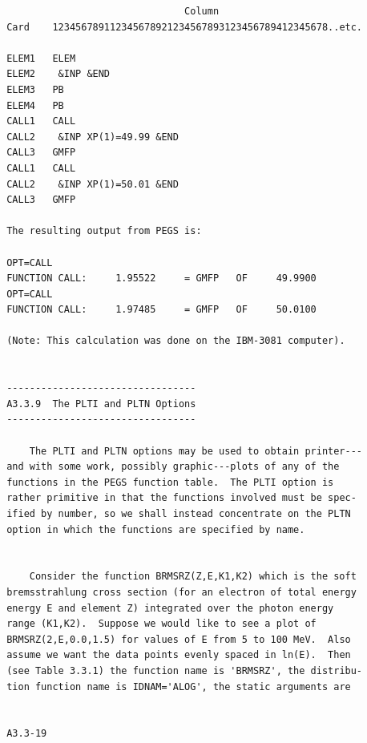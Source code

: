  \begin{verbatim}
                                Column
 Card    123456789112345678921234567893123456789412345678..etc.
 
 ELEM1   ELEM
 ELEM2    &INP &END
 ELEM3   PB
 ELEM4   PB
 CALL1   CALL
 CALL2    &INP XP(1)=49.99 &END
 CALL3   GMFP
 CALL1   CALL
 CALL2    &INP XP(1)=50.01 &END
 CALL3   GMFP
 
 The resulting output from PEGS is:
 
 OPT=CALL
 FUNCTION CALL:     1.95522     = GMFP   OF     49.9900
 OPT=CALL
 FUNCTION CALL:     1.97485     = GMFP   OF     50.0100
 
 (Note: This calculation was done on the IBM-3081 computer).
 

 ---------------------------------
 A3.3.9  The PLTI and PLTN Options
 ---------------------------------
 
     The PLTI and PLTN options may be used to obtain printer---
 and with some work, possibly graphic---plots of any of the
 functions in the PEGS function table.  The PLTI option is
 rather primitive in that the functions involved must be spec-
 ified by number, so we shall instead concentrate on the PLTN
 option in which the functions are specified by name.

 
     Consider the function BRMSRZ(Z,E,K1,K2) which is the soft
 bremsstrahlung cross section (for an electron of total energy
 energy E and element Z) integrated over the photon energy
 range (K1,K2).  Suppose we would like to see a plot of
 BRMSRZ(2,E,0.0,1.5) for values of E from 5 to 100 MeV.  Also
 assume we want the data points evenly spaced in ln(E).  Then
 (see Table 3.3.1) the function name is 'BRMSRZ', the distribu-
 tion function name is IDNAM='ALOG', the static arguments are


 A3.3-19
\end{verbatim} 
